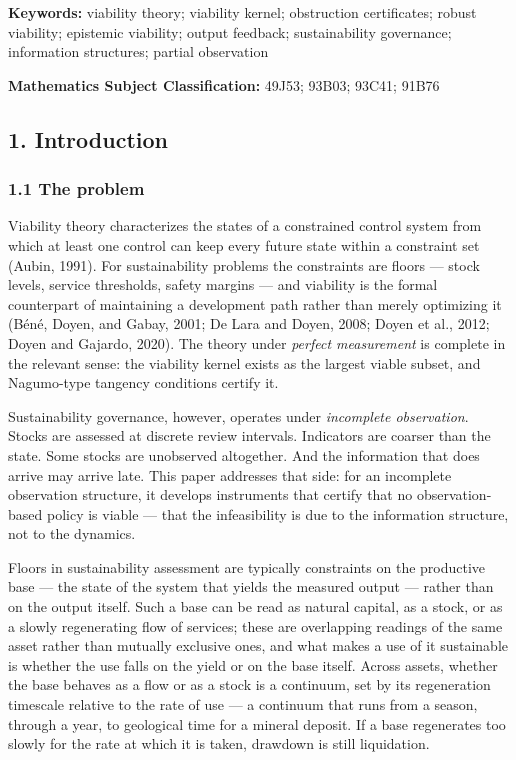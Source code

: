 \documentclass[10pt,twocolumn]{article}
\theoremstyle{definition}
\begin{document}
\begin{abstract}
The calculus is positioned against barrier certificates and estimation
tubes, and its monitoring and institutional consequences ---
observation timing, coarseness, aggregation, and bias --- are drawn.

\end{abstract}

\textbf{Keywords:} viability theory; viability kernel; obstruction
certificates; robust viability; epistemic viability; output feedback;
sustainability governance; information structures; partial observation

\textbf{Mathematics Subject Classification:} 49J53; 93B03; 93C41; 91B76

\subsection{1. Introduction}\label{introduction}

\subsubsection{1.1 The problem}\label{the-problem}

Viability theory characterizes the states of a constrained control system from which at least one control can keep every future state within a constraint set (Aubin, 1991). For sustainability problems the constraints are floors --- stock levels, service thresholds, safety margins --- and viability is the formal counterpart of maintaining a development path rather than merely optimizing it (B\'en\'e, Doyen, and Gabay, 2001; De Lara and Doyen, 2008;
Doyen et al., 2012; Doyen and Gajardo, 2020). The theory under
\emph{perfect measurement} is complete in the relevant sense: the
viability kernel exists as the largest viable subset, and Nagumo-type
tangency conditions certify it.

Sustainability governance, however, operates under \emph{incomplete
observation}. Stocks are assessed at discrete review intervals.
Indicators are coarser than the state. Some stocks are unobserved
altogether. And the information that does arrive may arrive late. This paper addresses that side: for an incomplete observation structure, it develops instruments that certify that no observation-based policy is viable --- that the infeasibility is due to the information structure, not to the dynamics.

Floors in sustainability assessment are typically constraints on the
productive base --- the state of the system that yields the measured
output --- rather than on the output itself. Such a base can be read as
natural capital, as a stock, or as a slowly regenerating flow of
services; these are overlapping readings of the same asset rather than
mutually exclusive ones, and what makes a use of it sustainable is
whether the use falls on the yield or on the base itself. Across
assets, whether the base behaves as a flow or as a stock is a
continuum, set by its regeneration timescale relative to the rate of
use --- a continuum that runs from a season, through a year, to
geological time for a mineral deposit. If a base regenerates too
slowly for the rate at which it is taken, drawdown is still
liquidation.
\end{document}
